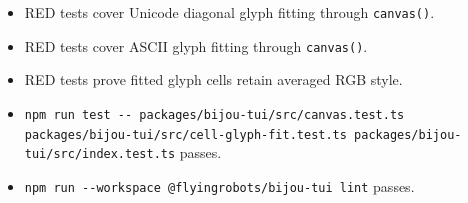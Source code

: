 \begin{itemize}
\tightlist
\item
  RED tests cover Unicode diagonal glyph fitting through \texttt{c\allowbreak{}a\allowbreak{}n\allowbreak{}v\allowbreak{}a\allowbreak{}s\allowbreak{}(\allowbreak{})}.
\item
  RED tests cover ASCII glyph fitting through \texttt{c\allowbreak{}a\allowbreak{}n\allowbreak{}v\allowbreak{}a\allowbreak{}s\allowbreak{}(\allowbreak{})}.
\item
  RED tests prove fitted glyph cells retain averaged RGB style.
\item
  \texttt{n\allowbreak{}p\allowbreak{}m\allowbreak{} \allowbreak{}r\allowbreak{}u\allowbreak{}n\allowbreak{} \allowbreak{}t\allowbreak{}e\allowbreak{}s\allowbreak{}t\allowbreak{} \allowbreak{}-\allowbreak{}-\allowbreak{} \allowbreak{}p\allowbreak{}a\allowbreak{}c\allowbreak{}k\allowbreak{}a\allowbreak{}g\allowbreak{}e\allowbreak{}s\allowbreak{}/\allowbreak{}b\allowbreak{}i\allowbreak{}j\allowbreak{}o\allowbreak{}u\allowbreak{}-\allowbreak{}t\allowbreak{}u\allowbreak{}i\allowbreak{}/\allowbreak{}s\allowbreak{}r\allowbreak{}c\allowbreak{}/\allowbreak{}c\allowbreak{}a\allowbreak{}n\allowbreak{}v\allowbreak{}a\allowbreak{}s\allowbreak{}.\allowbreak{}t\allowbreak{}e\allowbreak{}s\allowbreak{}t\allowbreak{}.\allowbreak{}t\allowbreak{}s\allowbreak{} \allowbreak{}p\allowbreak{}a\allowbreak{}c\allowbreak{}k\allowbreak{}a\allowbreak{}g\allowbreak{}e\allowbreak{}s\allowbreak{}/\allowbreak{}b\allowbreak{}i\allowbreak{}j\allowbreak{}o\allowbreak{}u\allowbreak{}-\allowbreak{}t\allowbreak{}u\allowbreak{}i\allowbreak{}/\allowbreak{}s\allowbreak{}r\allowbreak{}c\allowbreak{}/\allowbreak{}c\allowbreak{}e\allowbreak{}l\allowbreak{}l\allowbreak{}-\allowbreak{}g\allowbreak{}l\allowbreak{}y\allowbreak{}p\allowbreak{}h\allowbreak{}-\allowbreak{}f\allowbreak{}i\allowbreak{}t\allowbreak{}.\allowbreak{}t\allowbreak{}e\allowbreak{}s\allowbreak{}t\allowbreak{}.\allowbreak{}t\allowbreak{}s\allowbreak{} \allowbreak{}p\allowbreak{}a\allowbreak{}c\allowbreak{}k\allowbreak{}a\allowbreak{}g\allowbreak{}e\allowbreak{}s\allowbreak{}/\allowbreak{}b\allowbreak{}i\allowbreak{}j\allowbreak{}o\allowbreak{}u\allowbreak{}-\allowbreak{}t\allowbreak{}u\allowbreak{}i\allowbreak{}/\allowbreak{}s\allowbreak{}r\allowbreak{}c\allowbreak{}/\allowbreak{}i\allowbreak{}n\allowbreak{}d\allowbreak{}e\allowbreak{}x\allowbreak{}.\allowbreak{}t\allowbreak{}e\allowbreak{}s\allowbreak{}t\allowbreak{}.\allowbreak{}t\allowbreak{}s} passes.
\item
  \texttt{n\allowbreak{}p\allowbreak{}m\allowbreak{} \allowbreak{}r\allowbreak{}u\allowbreak{}n\allowbreak{} \allowbreak{}-\allowbreak{}-\allowbreak{}w\allowbreak{}o\allowbreak{}r\allowbreak{}k\allowbreak{}s\allowbreak{}p\allowbreak{}a\allowbreak{}c\allowbreak{}e\allowbreak{} \allowbreak{}@\allowbreak{}f\allowbreak{}l\allowbreak{}y\allowbreak{}i\allowbreak{}n\allowbreak{}g\allowbreak{}r\allowbreak{}o\allowbreak{}b\allowbreak{}o\allowbreak{}t\allowbreak{}s\allowbreak{}/\allowbreak{}b\allowbreak{}i\allowbreak{}j\allowbreak{}o\allowbreak{}u\allowbreak{}-\allowbreak{}t\allowbreak{}u\allowbreak{}i\allowbreak{} \allowbreak{}l\allowbreak{}i\allowbreak{}n\allowbreak{}t} passes.

\end{itemize}
